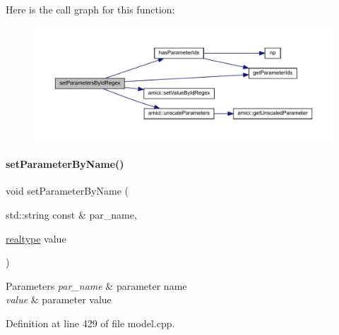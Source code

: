 Here is the call graph for this function\+:
\nopagebreak
\begin{figure}[H]
\begin{center}
\leavevmode
\includegraphics[width=350pt]{classamici_1_1_model_ab66d6b754637ed68449af96f5887a0be_cgraph}
\end{center}
\end{figure}
\mbox{\label{classamici_1_1_model_a6c5ceb2ba684cf68a7f21ad865091200}} 
\paragraph{\texorpdfstring{set\+Parameter\+By\+Name()}{setParameterByName()}}
{\footnotesize\ttfamily void set\+Parameter\+By\+Name (\begin{DoxyParamCaption}\item[{std\+::string const \&}]{par\+\_\+name,  }\item[{\mbox{\hyperlink{namespaceamici_a1bdce28051d6a53868f7ccbf5f2c14a3}{realtype}}}]{value }\end{DoxyParamCaption})}


\begin{DoxyParams}{Parameters}
{\em par\+\_\+name} & parameter name \\
\hline
{\em value} & parameter value \\
\hline
\end{DoxyParams}


Definition at line 429 of file model.\+cpp.

